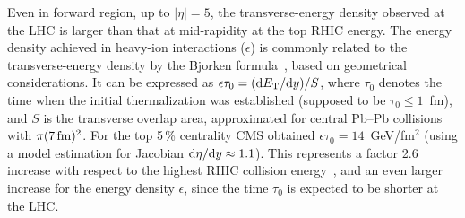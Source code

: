 Even in forward region, up to $|\eta| = 5$, the transverse-energy density observed at the LHC is larger than that at mid-rapidity at the top RHIC energy. The energy density achieved in heavy-ion interactions ($\epsilon$) is commonly related to the transverse-energy density by the Bjorken formula~\cite{Bjorken:1982qr}, based on geometrical considerations. It can be expressed as $\epsilon \tau_{0} = ({\rm d}E_{\rm T}/{\rm d}y) / S$, where $\tau_{0}$ denotes the time when the initial thermalization was established (supposed to be $\tau_{0} \leq 1$~fm), and $S$ is the transverse overlap area, approximated for central Pb--Pb collisions with $\pi (7\,{\rm fm})^2$. For the top 5\,\% centrality CMS obtained $\epsilon \tau_{0} = 14$~GeV/fm$^2$ (using a model estimation for Jacobian ${\rm d}\eta/{\rm d}y \approx 1.1$). This represents a factor 2.6 increase with respect to the highest RHIC collision energy~\cite{Adcox:2004mh}, and an even larger increase for the energy density $\epsilon$, since the time $\tau_{0}$ is expected to be shorter at the LHC.
